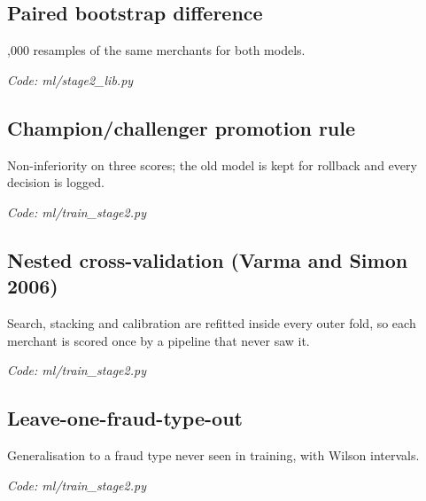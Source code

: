 \documentclass[11pt,a4paper]{article}
\newcommand{\where}[1]{\par{\small\itshape\color{mute}Code: #1}\par}
\begin{document}
\subsection*{Paired bootstrap difference}
\par\smallskip\noindent{}\par{},000 resamples of the same merchants for both models.
\where{ml/stage2\_lib.py}

\subsection*{Champion/challenger promotion rule}
\par\smallskip\noindent{}\par\smallskip
Non-inferiority on three scores; the old model is kept for rollback and every decision is logged.
\where{ml/train\_stage2.py}

\subsection*{Nested cross-validation (Varma and Simon 2006)}
\par\smallskip\noindent{}\par\smallskip
Search, stacking and calibration are refitted inside every outer fold, so each merchant is scored once by a pipeline that never saw it.
\where{ml/train\_stage2.py}

\subsection*{Leave-one-fraud-type-out}
\par\smallskip\noindent{}\par\smallskip
Generalisation to a fraud type never seen in training, with Wilson intervals.
\where{ml/train\_stage2.py}
\end{document}

